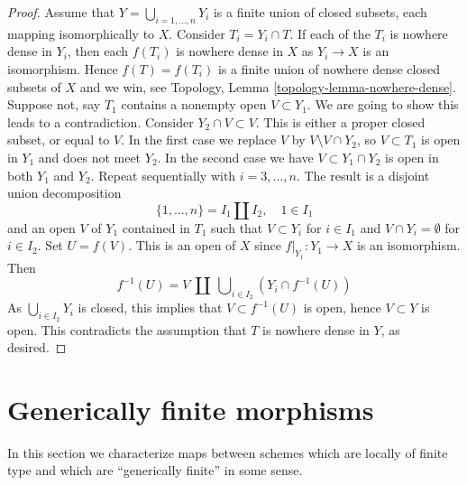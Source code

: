 \begin{proof}
\medskip\noindent
Assume that $Y = \bigcup_{i = 1, \ldots, n} Y_i$ is a finite union of
closed subsets, each mapping isomorphically to $X$. Consider
$T_i = Y_i \cap T$. If each of the $T_i$ is nowhere dense in $Y_i$,
then each $f(T_i)$ is nowhere dense in $X$ as $Y_i \to X$ is an isomorphism.
Hence $f(T) = f(T_i)$ is a finite union of nowhere dense closed
subsets of $X$ and we win, see
Topology, Lemma \ref{topology-lemma-nowhere-dense}.
Suppose not, say $T_1$ contains a nonempty open $V \subset Y_1$.
We are going to show this leads to a contradiction.
Consider $Y_2 \cap V \subset V$. This is either
a proper closed subset, or equal to $V$. In the first case we replace
$V$ by $V \setminus V \cap Y_2$, so $V \subset T_1$ is open in $Y_1$ and
does not meet $Y_2$. In the second case we have
$V \subset Y_1 \cap Y_2$ is open in both $Y_1$ and $Y_2$.
Repeat sequentially with $i = 3, \ldots, n$. The result is a disjoint
union decomposition
$$
\{1, \ldots, n\} = I_1 \coprod I_2, \quad 1 \in I_1
$$
and an open $V$ of $Y_1$ contained in $T_1$ such that $V \subset Y_i$
for $i \in I_1$ and $V \cap Y_i = \emptyset$ for $i \in I_2$. Set
$U = f(V)$. This is an open of $X$ since $f|_{Y_1} : Y_1 \to X$ is
an isomorphism. Then
$$
f^{-1}(U) = V\ \coprod\ \bigcup\nolimits_{i \in I_2} (Y_i \cap f^{-1}(U))
$$
As $\bigcup_{i \in I_2} Y_i$ is closed, this implies that
$V \subset f^{-1}(U)$ is open, hence $V \subset Y$ is open.
This contradicts the assumption that $T$ is nowhere dense in $Y$, as desired.
\end{proof}


\section{Generically finite morphisms}
\label{section-generically-finite}

\noindent
In this section we characterize maps between schemes
which are locally of finite type and which are ``generically finite''
in some sense.

